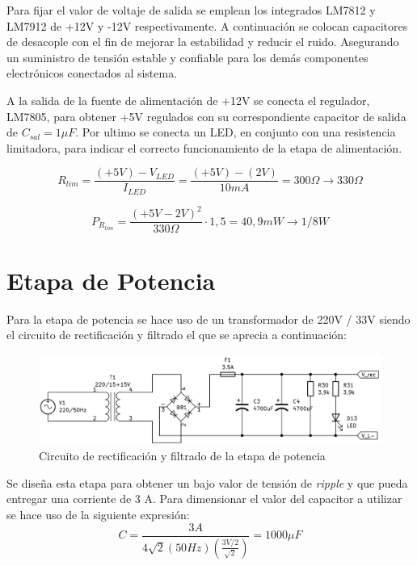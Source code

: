 Para fijar el valor de voltaje de salida se emplean los integrados LM7812 y LM7912 de +12V y -12V respectivamente. A continuación se colocan capacitores de desacople con el fin de mejorar la estabilidad y reducir el ruido. Asegurando un suministro de tensión estable y confiable para los demás componentes electrónicos conectados al sistema. \par 
A la salida de la fuente de alimentación de +12V se conecta el regulador, LM7805, para obtener +5V regulados con su correspondiente capacitor de salida de $C_{sal} =1\mu F$. Por ultimo se conecta un LED, en conjunto con una resistencia limitadora, para indicar el correcto funcionamiento de la etapa de alimentación. \par 
\begin{equation}
R_{lim} =\frac{(+5V)-V_{LED} }{I_{LED} }=\frac{(+5V)-(2V)}{10mA}=300\Omega \to 330\Omega
\end{equation} \par 
\begin{equation}
P_{R_{lim} } =\frac{(+5V-2V)^2 }{330\Omega }\cdot 1,5=40,9mW\to 1/8W
\end{equation}

\section{Etapa de Potencia}\par

Para la etapa de potencia se hace uso de un transformador de 220V / 33V siendo el circuito de rectificación y filtrado el que se aprecia a continuación:

\begin{figure} [H]
	\centering
	\includegraphics[width=\textwidth]{./imagenes/Rectificador_potencia.png}
	\caption{Circuito de rectificación y filtrado de la etapa de potencia}
	\label{F:rectificador_potencia}
\end{figure} \par 

Se diseña esta etapa para obtener un bajo valor de tensión de \textit{ripple} y que pueda entregar una corriente de 3 A. Para dimensionar el valor del capacitor a utilizar se hace uso de la siguiente expresión:
\begin{equation}
C=\frac{3A}{4\sqrt{2}(50Hz)(\frac{3V/2}{\sqrt{2}})}=1000\mu F
\end{equation} \par 

